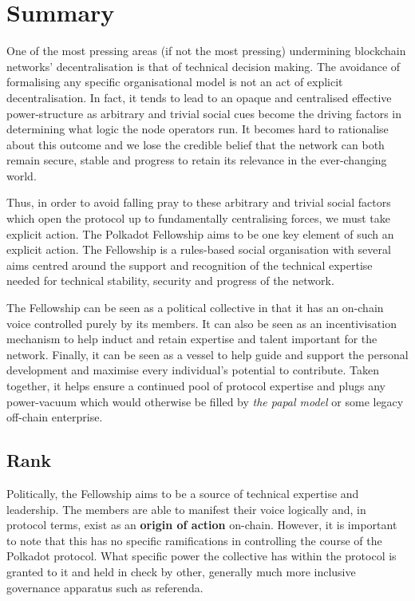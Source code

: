 \documentclass[9pt,oneside]{amsart}
\begin{document}
\section{Summary}\label{summary}

One of the most pressing areas (if not the most pressing) undermining blockchain networks' decentralisation is that of technical decision making. The avoidance of formalising any specific organisational model is not an act of explicit decentralisation. In fact, it tends to lead to an opaque and centralised effective power-structure as arbitrary and trivial social cues become the driving factors in determining what logic the node operators run. It becomes hard to rationalise about this outcome and we lose the credible belief that the network can both remain secure, stable and progress to retain its relevance in the ever-changing world.

Thus, in order to avoid falling pray to these arbitrary and trivial social factors which open the protocol up to fundamentally centralising forces, we must take explicit action. The Polkadot Fellowship aims to be one key element of such an explicit action. The Fellowship is a rules-based social organisation with several aims centred around the support and recognition of the technical expertise needed for technical stability, security and progress of the network.

The Fellowship can be seen as a political collective in that it has an on-chain voice controlled purely by its members. It can also be seen as an incentivisation mechanism to help induct and retain expertise and talent important for the network. Finally, it can be seen as a vessel to help guide and support the personal development and maximise every individual's potential to contribute. Taken together, it helps ensure a continued pool of protocol expertise and plugs any power-vacuum which would otherwise be filled by \emph{the papal model} or some legacy off-chain enterprise.


\subsection{Rank}

Politically, the Fellowship aims to be a source of technical expertise and leadership. The members are able to manifest their voice logically and, in protocol terms, exist as an \textbf{origin of action} on-chain. However, it is important to note that this has no specific ramifications in controlling the course of the Polkadot protocol. What specific power the collective has within the protocol is granted to it and held in check by other, generally much more inclusive governance apparatus such as referenda.
\end{document}
